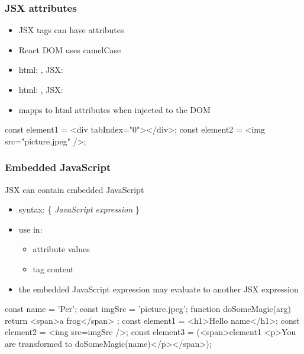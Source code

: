 \begin{frame}[fragile] \frametitle{JSX attributes}
\begin{itemize}
  \item JSX tags can have attributes
  \item React DOM uses camelCase
  \item html: , JSX: 
  \item html: , JSX: 
  \item mapps to html attributes when injected to the DOM
\end{itemize}

\vspace{8mm}
\begin{CodeBox}{}
const element1 = <div tabIndex="0"></div>;
const element2 = <img src="picture.jpeg" />;
\end{CodeBox}
\end{frame}

\begin{frame}[fragile] \frametitle{Embedded JavaScript}
JSX can contain embedded JavaScript
\begin{itemize}
  \item syntax: \{ \emph{JavaScript expression} \}
  \item use in:
  \begin{itemize}
    \item attribute values
    \item tag content
  \end{itemize}
  \item the embedded JavaScript expression may evaluate to another JSX expression
\end{itemize}
\vspace{3mm}
\begin{CodeBox}{}
const name = 'Per';
const imgSrc = 'picture.jpeg';
function doSomeMagic(arg) { return <span>a frog</span> };
const element1 = <h1>Hello {name}</h1>;
const element2 = <img src={imgSrc} />;
const element3 = (<span>{element1}
  <p>You are transformed to {doSomeMagic(name)}</p></span>);
\end{CodeBox}
\end{frame}

